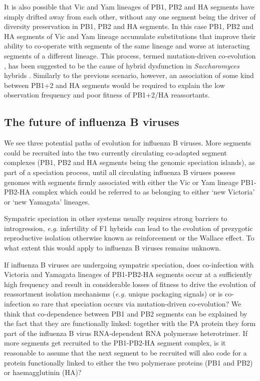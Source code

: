 \documentclass[11pt,oneside,letterpaper]{article}
\begin{document}
It is also possible that Vic and Yam lineages of PB1, PB2 and HA segments have simply drifted away from each other, without any one segment being the driver of diversity preservation in PB1, PB2 and HA segments.
In this case PB1, PB2 and HA segments of Vic and Yam lineage accumulate substitutions that improve their ability to co-operate with segments of the same lineage and worse at interacting segments of a different lineage.
This process, termed mutation-driven co-evolution \cite{presgraves2010}, has been suggested to be the cause of hybrid dysfunction in \textit{Saccharomyces} hybrids \cite{lee2008}.
Similarly to the previous scenario, however, an association of some kind between PB1+2 and HA segments would be required to explain the low observation frequency and poor fitness of PB1+2/HA reassortants.

\subsection*{The future of influenza B viruses}
We see three potential paths of evolution for influenza B viruses.
More segments could be recruited into the two currently circulating co-adapted segment complexes (PB1, PB2 and HA segments being the genomic speciation islands), as part of a speciation process, until all circulating influenza B viruses possess genomes with segments firmly associated with either the Vic or Yam lineage PB1-PB2-HA complex which could be referred to as belonging to either `new Victoria' or `new Yamagata' lineages.

Sympatric speciation in other systems usually requires strong barriers to introgression, \textit{e.g.} infertility of F1 hybrids can lead to the evolution of prezygotic reproductive isolation otherwise known as reinforcement or the Wallace effect.
To what extent this would apply to influenza B viruses remains unknown.

If influenza B viruses are undergoing sympatric speciation, does co-infection with Victoria and Yamagata lineages of PB1-PB2-HA segments occur at a sufficiently high frequency and result in considerable losses of fitness to drive the evolution of reassortment isolation mechanisms (\textit{e.g.} unique packaging signals) or is co-infection so rare that speciation occurs via mutation-driven co-evolution?
We think that co-dependence between PB1 and PB2 segments can be explained by the fact that they are functionally linked: together with the PA protein they form part of the influenza B virus RNA-dependent RNA polymerase heterotrimer.
If more segments get recruited to the PB1-PB2-HA segment complex, is it reasonable to assume that the next segment to be recruited will also code for a protein functionally linked to either the two polymerase proteins (PB1 and PB2) or haemagglutinin (HA)?
\end{document}
